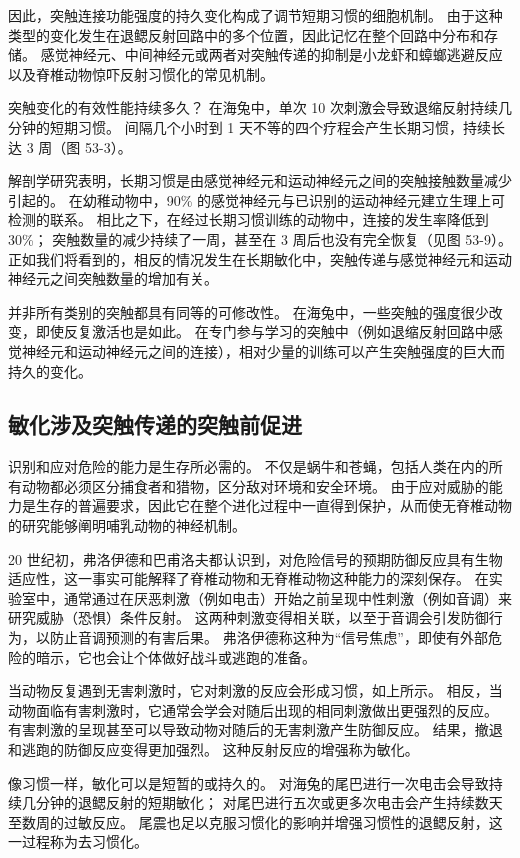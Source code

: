 因此，突触连接功能强度的持久变化构成了调节短期习惯的细胞机制。 由于这种类型的变化发生在退鳃反射回路中的多个位置，因此记忆在整个回路中分布和存储。 感觉神经元、中间神经元或两者对突触传递的抑制是小龙虾和蟑螂逃避反应以及脊椎动物惊吓反射习惯化的常见机制。

突触变化的有效性能持续多久？ 在海兔中，单次 10 次刺激会导致退缩反射持续几分钟的短期习惯。 间隔几个小时到 1 天不等的四个疗程会产生长期习惯，持续长达 3 周（图 53-3）。

解剖学研究表明，长期习惯是由感觉神经元和运动神经元之间的突触接触数量减少引起的。 在幼稚动物中，90\% 的感觉神经元与已识别的运动神经元建立生理上可检测的联系。 相比之下，在经过长期习惯训练的动物中，连接的发生率降低到 30\%； 突触数量的减少持续了一周，甚至在 3 周后也没有完全恢复（见图 53-9）。 正如我们将看到的，相反的情况发生在长期敏化中，突触传递与感觉神经元和运动神经元之间突触数量的增加有关。

并非所有类别的突触都具有同等的可修改性。 在海兔中，一些突触的强度很少改变，即使反复激活也是如此。 在专门参与学习的突触中（例如退缩反射回路中感觉神经元和运动神经元之间的连接），相对少量的训练可以产生突触强度的巨大而持久的变化。

\subsection{敏化涉及突触传递的突触前促进}
识别和应对危险的能力是生存所必需的。 不仅是蜗牛和苍蝇，包括人类在内的所有动物都必须区分捕食者和猎物，区分敌对环境和安全环境。 由于应对威胁的能力是生存的普遍要求，因此它在整个进化过程中一直得到保护，从而使无脊椎动物的研究能够阐明哺乳动物的神经机制。

20 世纪初，弗洛伊德和巴甫洛夫都认识到，对危险信号的预期防御反应具有生物适应性，这一事实可能解释了脊椎动物和无脊椎动物这种能力的深刻保存。 在实验室中，通常通过在厌恶刺激（例如电击）开始之前呈现中性刺激（例如音调）来研究威胁（恐惧）条件反射。 这两种刺激变得相关联，以至于音调会引发防御行为，以防止音调预测的有害后果。 弗洛伊德称这种为“信号焦虑”，即使有外部危险的暗示，它也会让个体做好战斗或逃跑的准备。

当动物反复遇到无害刺激时，它对刺激的反应会形成习惯，如上所示。 相反，当动物面临有害刺激时，它通常会学会对随后出现的相同刺激做出更强烈的反应。 有害刺激的呈现甚至可以导致动物对随后的无害刺激产生防御反应。 结果，撤退和逃跑的防御反应变得更加强烈。 这种反射反应的增强称为敏化。

像习惯一样，敏化可以是短暂的或持久的。 对海兔的尾巴进行一次电击会导致持续几分钟的退鳃反射的短期敏化； 对尾巴进行五次或更多次电击会产生持续数天至数周的过敏反应。 尾震也足以克服习惯化的影响并增强习惯性的退鳃反射，这一过程称为去习惯化。

